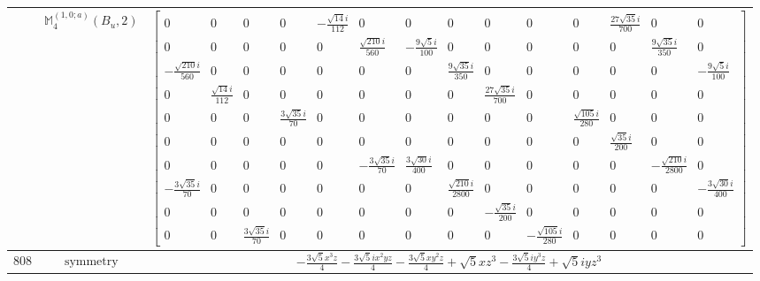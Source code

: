 \documentclass[fleqn,8pt,landscape]{jsarticle}
\begin{document}
\begin{longtable}{ccc}
$  $ & $ \mathbb{M}_{4}^{(1,0;a)}(B_{u},2) $ & $ \begin{bmatrix} 0 & 0 & 0 & 0 & - \frac{\sqrt{14} i}{112} & 0 & 0 & 0 & 0 & 0 & 0 & \frac{27 \sqrt{35} i}{700} & 0 & 0 \\ 0 & 0 & 0 & 0 & 0 & \frac{\sqrt{210} i}{560} & - \frac{9 \sqrt{5} i}{100} & 0 & 0 & 0 & 0 & 0 & \frac{9 \sqrt{35} i}{350} & 0 \\ - \frac{\sqrt{210} i}{560} & 0 & 0 & 0 & 0 & 0 & 0 & \frac{9 \sqrt{35} i}{350} & 0 & 0 & 0 & 0 & 0 & - \frac{9 \sqrt{5} i}{100} \\ 0 & \frac{\sqrt{14} i}{112} & 0 & 0 & 0 & 0 & 0 & 0 & \frac{27 \sqrt{35} i}{700} & 0 & 0 & 0 & 0 & 0 \\ 0 & 0 & 0 & \frac{3 \sqrt{35} i}{70} & 0 & 0 & 0 & 0 & 0 & 0 & \frac{\sqrt{105} i}{280} & 0 & 0 & 0 \\ 0 & 0 & 0 & 0 & 0 & 0 & 0 & 0 & 0 & 0 & 0 & \frac{\sqrt{35} i}{200} & 0 & 0 \\ 0 & 0 & 0 & 0 & 0 & - \frac{3 \sqrt{35} i}{70} & \frac{3 \sqrt{30} i}{400} & 0 & 0 & 0 & 0 & 0 & - \frac{\sqrt{210} i}{2800} & 0 \\ - \frac{3 \sqrt{35} i}{70} & 0 & 0 & 0 & 0 & 0 & 0 & \frac{\sqrt{210} i}{2800} & 0 & 0 & 0 & 0 & 0 & - \frac{3 \sqrt{30} i}{400} \\ 0 & 0 & 0 & 0 & 0 & 0 & 0 & 0 & - \frac{\sqrt{35} i}{200} & 0 & 0 & 0 & 0 & 0 \\ 0 & 0 & \frac{3 \sqrt{35} i}{70} & 0 & 0 & 0 & 0 & 0 & 0 & - \frac{\sqrt{105} i}{280} & 0 & 0 & 0 & 0 \end{bmatrix} $ \\ \hline
$ 808 $ & $ \text{symmetry} $ & $ - \frac{3 \sqrt{5} x^{3} z}{4} - \frac{3 \sqrt{5} i x^{2} y z}{4} - \frac{3 \sqrt{5} x y^{2} z}{4} + \sqrt{5} x z^{3} - \frac{3 \sqrt{5} i y^{3} z}{4} + \sqrt{5} i y z^{3} $ \\

\end{longtable}
\end{document}

